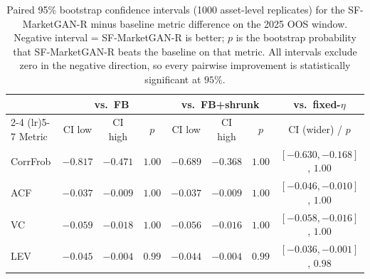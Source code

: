 \begin{table}[h]
\centering
\caption{Paired 95\% bootstrap confidence intervals (1000 asset-level replicates) for the SF-MarketGAN-R minus baseline metric difference on the 2025 OOS window. Negative interval = SF-MarketGAN-R is better; $p$ is the bootstrap probability that SF-MarketGAN-R beats the baseline on that metric. All intervals exclude zero in the negative direction, so every pairwise improvement is statistically significant at $95\%$.}
\label{tab:bootstrap}
\small
\begin{tabular}{lccccccc}
\toprule
 & \multicolumn{3}{c}{vs.\ FB} & \multicolumn{3}{c}{vs.\ FB+shrunk} & vs.\ fixed-$\eta$ \\
\cmidrule(lr){2-4} \cmidrule(lr){5-7}
Metric & CI low & CI high & $p$ & CI low & CI high & $p$ & CI (wider) / $p$ \\
\midrule
CorrFrob & $-0.817$ & $-0.471$ & $1.00$ & $-0.689$ & $-0.368$ & $1.00$ & $[-0.630, -0.168]$, $1.00$ \\
ACF      & $-0.037$ & $-0.009$ & $1.00$ & $-0.037$ & $-0.009$ & $1.00$ & $[-0.046, -0.010]$, $1.00$ \\
VC       & $-0.059$ & $-0.018$ & $1.00$ & $-0.056$ & $-0.016$ & $1.00$ & $[-0.058, -0.016]$, $1.00$ \\
LEV      & $-0.045$ & $-0.004$ & $0.99$ & $-0.044$ & $-0.004$ & $0.99$ & $[-0.036, -0.001]$, $0.98$ \\
\bottomrule
\end{tabular}
\end{table}
